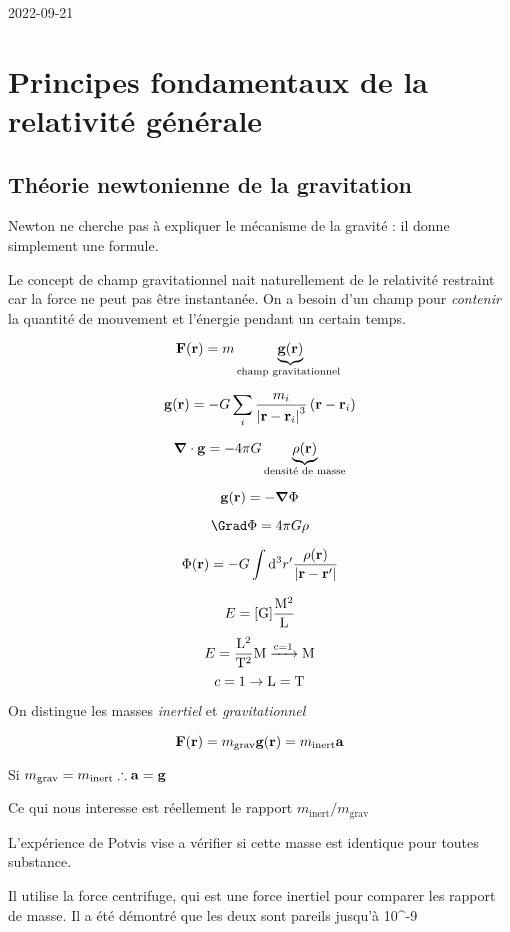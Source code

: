 


2022-09-21

\setcounter{section}{2}
\section{Principes fondamentaux de la relativité générale}
\subsection{Théorie newtonienne de la gravitation}

Newton ne cherche pas à expliquer le mécanisme de la gravité : il donne simplement une formule.

Le concept de champ gravitationnel nait naturellement de le relativité restraint car la force ne peut pas être instantanée. On a besoin d'un champ pour \textit{contenir} la quantité de mouvement et l'énergie pendant un certain temps.

$$\vb{F}(\vb{r}) = m \underbrace{\vb{g}(\vb{r})}_{\text{champ gravitationnel } } $$ 

$$\vb{g} (\vb{r}) = -G \sum_i \frac{m_i}{\abs{\vb{r}-\vb{r}_i}^{3}} \left( \vb{r}-\vb{r}_i \right) $$ 

$$\grad \cdot \vb{g} = -4\pi G \underbrace{\rho (\vb{r})}_{\text{densité de masse} } $$ 

$$\vb{g} (\vb{r}) = - \grad \Phi$$ 

$$\Grad \Phi = 4\pi G\rho$$ 

$$\Phi(\vb{r}) = -G \int \dd^{3}r' \frac{\rho (\vb{r})}{\abs{\vb{r}-\vb{r}'} } $$ 


\begin{tcolorbox}[title=Unitées ]
	$$E = \rm[G] \frac{M^{2}}{L}  $$
	$$E =\rm  \frac{L^{2}}{T^2} M \xrightarrow{c=1} M $$ 
	$$c =1 \rm \to L= T$$ 
\end{tcolorbox}

On distingue les masses \textit{inertiel} et \textit{gravitationnel} 

$$\vb{F}(\vb{r}) = m_{\text{grav}}  \vb{g}(\vb{r}) = m_{\text{inert}} \vb{a} $$ 

Si $m_{\text{grav}} = m_{\text{inert}} \therefore \vb{a} = \vb{g} $ 


Ce qui nous interesse est réellement le rapport $m_{\text{inert}}/m_{\text{grav}}  $ 

L'expérience de Potvis vise a vérifier si cette masse est identique pour toutes substance.

Il utilise la force centrifuge, qui est une force inertiel pour comparer les rapport de masse. Il a été démontré que les deux sont pareils jusqu'à 10^{-9} 


